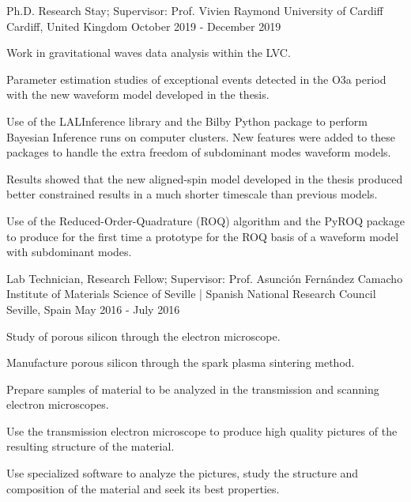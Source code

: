 \begin{cventries}
    \cventry
    {Ph.D. Research Stay; Supervisor: Prof. Vivien Raymond}
    {University of Cardiff}
    {Cardiff, United Kingdom}
    {October 2019 - December 2019}
    {
      \begin{cvitems}
        \item {Work in gravitational waves data analysis within the LVC.}
        \item {Parameter estimation studies of exceptional events detected in the O3a period with the new waveform model developed in the thesis.}
        \item {Use of the LALInference library and the Bilby Python package to perform Bayesian Inference runs on computer clusters. New features were added to these packages to handle the extra freedom of subdominant modes waveform models.}
        \item {Results showed that the new aligned-spin model developed in the thesis produced better constrained results in a much shorter timescale than previous models.}
        \item {Use of the Reduced-Order-Quadrature (ROQ) algorithm and the PyROQ package to produce for the first time a prototype for the ROQ basis of a waveform model with subdominant modes.}
      \end{cvitems}
    }\vspace{-10pt}

\cventry
    {Lab Technician, Research Fellow; Supervisor: Prof. Asunción Fernández Camacho}
    {Institute of Materials Science of Seville | Spanish National Research Council}
    {Seville, Spain}
    {May 2016 - July 2016}
    {
      \begin{cvitems}
        \item {Study of porous silicon through the electron microscope.}
        \item {Manufacture porous silicon through the spark plasma sintering method. }
        \item {Prepare samples of material to be analyzed in the transmission and scanning electron microscopes. }
        \item {Use the transmission electron microscope to produce high quality pictures of the resulting structure of the material.}
        \item {Use specialized software to analyze the pictures, study the structure and composition of the material and seek its best properties.}
      \end{cvitems}
    }\vspace{-10pt}
    

\end{cventries}
